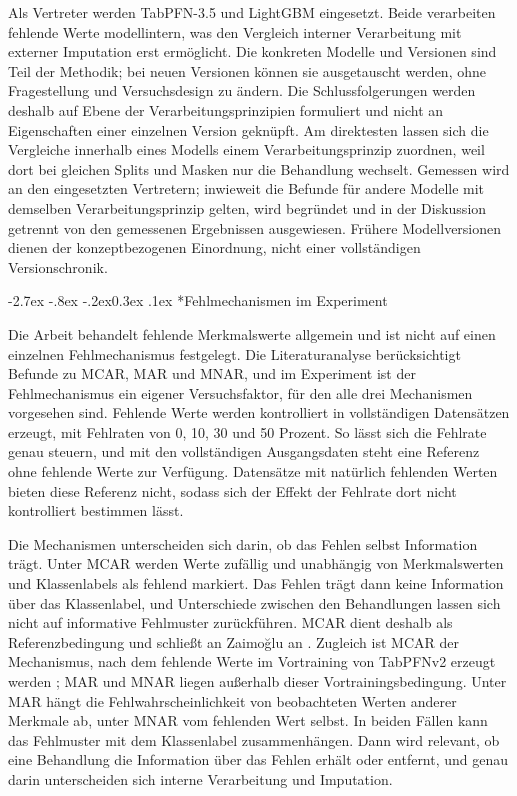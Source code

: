 \documentclass[12pt,a4paper]{article}
\makeatletter
\renewcommand\subsection{\@startsection{subsection}{2}{\z@}%
  {-2.7ex \@plus -.8ex \@minus -.2ex}{0.3ex \@plus .1ex}%
  {\normalfont\large\bfseries}}
\makeatother
\begin{document}
Als Vertreter werden TabPFN-3.5 und LightGBM eingesetzt. Beide
verarbeiten fehlende Werte modellintern, was den Vergleich interner
Verarbeitung mit externer Imputation erst ermöglicht. Die konkreten
Modelle und Versionen sind Teil der Methodik; bei neuen Versionen
können sie ausgetauscht werden, ohne Fragestellung und Versuchsdesign
zu ändern. Die Schlussfolgerungen werden deshalb auf Ebene der
Verarbeitungsprinzipien formuliert und nicht an Eigenschaften einer
einzelnen Version geknüpft. Am direktesten lassen sich die Vergleiche
innerhalb eines Modells einem Verarbeitungsprinzip zuordnen, weil
dort bei gleichen Splits und Masken nur die Behandlung wechselt.
Gemessen wird an den eingesetzten Vertretern; inwieweit die Befunde
für andere Modelle mit demselben Verarbeitungsprinzip gelten, wird
begründet und in der Diskussion getrennt von den gemessenen
Ergebnissen ausgewiesen. Frühere Modellversionen dienen
der konzeptbezogenen Einordnung, nicht einer vollständigen
Versionschronik.

\subsection*{Fehlmechanismen im Experiment}

Die Arbeit behandelt fehlende Merkmalswerte allgemein und ist nicht
auf einen einzelnen Fehlmechanismus festgelegt. Die Literaturanalyse
berücksichtigt Befunde zu MCAR, MAR und MNAR, und im Experiment ist
der Fehlmechanismus ein eigener Versuchsfaktor, für den alle drei
Mechanismen vorgesehen sind. Fehlende Werte werden kontrolliert in
vollständigen Datensätzen erzeugt, mit Fehlraten von 0, 10, 30 und
50 Prozent. So lässt sich die Fehlrate genau steuern, und mit den
vollständigen Ausgangsdaten steht eine Referenz ohne fehlende Werte
zur Verfügung. Datensätze mit natürlich fehlenden Werten bieten diese
Referenz nicht, sodass sich der Effekt der Fehlrate dort nicht
kontrolliert bestimmen lässt.

Die Mechanismen unterscheiden sich darin, ob das Fehlen selbst
Information trägt. Unter MCAR werden Werte zufällig und unabhängig
von Merkmalswerten und Klassenlabels als fehlend markiert. Das Fehlen
trägt dann keine Information über das Klassenlabel, und Unterschiede
zwischen den Behandlungen lassen sich nicht auf informative Fehlmuster
zurückführen. MCAR dient deshalb als Referenzbedingung und schließt an
Zaimo\u{g}lu an \cite{zaimoglu_tabpfn_2026}. Zugleich
ist MCAR der Mechanismus, nach dem fehlende Werte im Vortraining von
TabPFNv2 erzeugt werden \cite[Methods]{hollmann_accurate_2025}; MAR
und MNAR liegen außerhalb dieser Vortrainingsbedingung. Unter MAR
hängt die Fehlwahrscheinlichkeit von beobachteten Werten anderer
Merkmale ab, unter MNAR vom fehlenden Wert selbst. In beiden Fällen
kann das Fehlmuster mit dem Klassenlabel zusammenhängen. Dann wird
relevant, ob eine Behandlung die Information über das Fehlen erhält
oder entfernt, und genau darin unterscheiden sich interne Verarbeitung
und Imputation.
\end{document}
